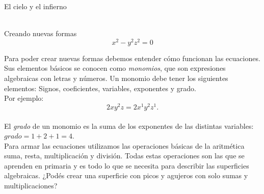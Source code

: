 \documentclass[es]{../../common/SurferDesc}%
\begin{document}
\footnotesize


\begin{surferPage}
  \begin{surferTitle}El cielo y el infierno\end{surferTitle}  \\
Creando nuevas formas \\
\smallskip
\[x^2	- y^2z^2	= 0\]

\singlespacing
Para poder crear nuevas formas debemos entender cómo funcionan las ecuaciones. Sus elementos básicos se conocen como  {\it monomios}, que son expresiones algebraicas con letras y números.
\singlespacing
Un monomio debe tener los siguientes elementos:
Signos, coeficientes, variables, exponentes y grado.\\
\singlespacing
Por ejemplo: 
\smallskip
\[2xy^2z = 2x^1y^2z^1.\]
\\
\smallskip
El  {\it grado} de un monomio es la suma de los exponentes de las distintas variables: $grado = 1+2+1=4$.  \\
\singlespacing
Para armar las ecuaciones utilizamos las operaciones básicas de la aritmética suma, resta, multiplicación y división. Todas estas operaciones son las que se aprenden en primaria y es todo lo que se necesita para describir las superficies algebraicas.
\singlespacing
¿Podés crear una superficie con picos y agujeros con solo sumas y multiplicaciones?


  \begin{surferText}
     \end{surferText}
\end{surferPage}
\end{document}
